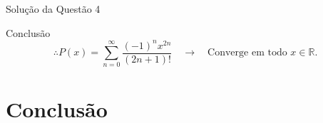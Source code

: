 \documentclass[8pt,aspectratio = 169]{beamer}
\begin{document}
\begin{frame}[allowframebreaks]{Solução da Questão 4}
    \framebreak %
    

    \begin{block}{Conclusão}
        \[ \therefore P(x) = \sum_{n=0}^{\infty} \frac{(-1)^n x^{2n}}{(2n+1)!} \quad \longrightarrow \quad \text{Converge em todo } x \in \mathbb{R}. \]
    \end{block}
    
\end{frame}

\section{Conclusão}
\end{document}
